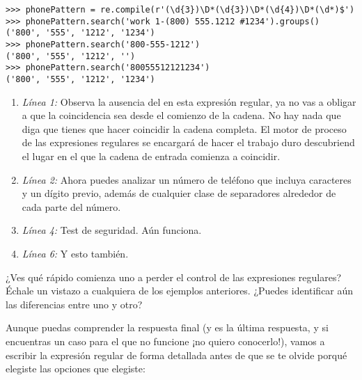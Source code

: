 \noindent\begin{minipage}{\textwidth}
\begin{lstlisting}[mathescape=False]
>>> phonePattern = re.compile(r'(\d{3})\D*(\d{3})\D*(\d{4})\D*(\d*)$')
>>> phonePattern.search('work 1-(800) 555.1212 #1234').groups()
('800', '555', '1212', '1234')
>>> phonePattern.search('800-555-1212')
('800', '555', '1212', '')
>>> phonePattern.search('80055512121234')
('800', '555', '1212', '1234')
\end{lstlisting}
\end{minipage}

\begin{enumerate}

\item \emph{Línea 1:} Observa la ausencia del \codigo{\^} en esta expresión regular, ya no vas a obligar a que la coincidencia sea desde el comienzo de la cadena. No hay nada que diga que tienes que hacer coincidir la cadena completa. El motor de proceso de las expresiones regulares se encargará de hacer el trabajo duro descubriend el lugar en el que la cadena de entrada comienza a coincidir.

\item \emph{Línea 2:} Ahora puedes analizar un número de teléfono que incluya caracteres y un dígito previo, además de cualquier clase de separadores alrededor de cada parte del número.

\item \emph{Línea 4:} Test de seguridad. Aún funciona.

\item \emph{Línea 6:} Y esto también.

\end{enumerate}

¿Ves qué rápido comienza uno a perder el control de las expresiones regulares? Échale un vistazo a cualquiera de los ejemplos anteriores. ¿Puedes identificar aún las diferencias entre uno y otro?

Aunque puedas comprender la respuesta final (y es la última respuesta, y si encuentras un caso para el que no funcione ¡no quiero conocerlo!), vamos a escribir la expresión regular de forma detallada antes de que se te olvide porqué elegiste las opciones que elegiste:

